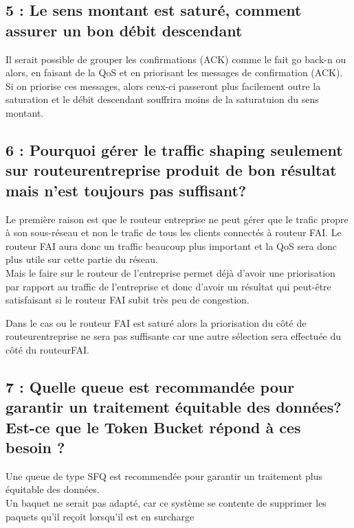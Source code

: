 \documentclass{article}
\begin{document}
\subsection*{5 : Le sens montant est saturé, comment assurer un bon débit descendant}

Il serait possible de grouper les confirmations (ACK) comme le fait go back-n\cite{GoBackN} ou alors, en faisant de la QoS et en priorisant les messages de confirmation (ACK).\\

Si on priorise ces messages, alors ceux-ci passeront plus facilement outre la saturation et le débit descendant souffrira moins de la saturatuion du sens montant.


\subsection*{6 : Pourquoi gérer le traffic shaping seulement sur routeurentreprise produit de bon résultat mais n'est toujours pas suffisant?}

Le première raison est que le routeur entreprise ne peut gérer que le trafic propre à son sous-réseau et non le trafic de tous les clients connectés à routeur FAI. Le routeur FAI aura donc un traffic beaucoup plus important et la QoS sera donc plus utile sur cette partie du réseau.\\

Mais le faire sur le routeur de l'entreprise permet déjà d'avoir une priorisation par rapport au traffic de l'entreprise et donc d'avoir un résultat qui peut-être satisfaisant si le routeur FAI subit très peu de congestion.

Dans le cas ou le routeur FAI est saturé alors la priorisation du côté de routeurentreprise ne sera pas suffisante car une autre sélection sera effectuée du côté du routeurFAI.

\subsection*{7 : Quelle queue est recommandée pour garantir un traitement équitable des données? Est-ce que le Token Bucket répond à ces besoin ?}

Une queue de type SFQ \cite{SFQ} est recommendée pour garantir un traitement plus équitable des données.\\

Un baquet ne serait pas adapté, car ce système se contente de supprimer les paquets qu'il reçoit lorsqu'il est en surcharge \cite{Bucket}
\end{document}

